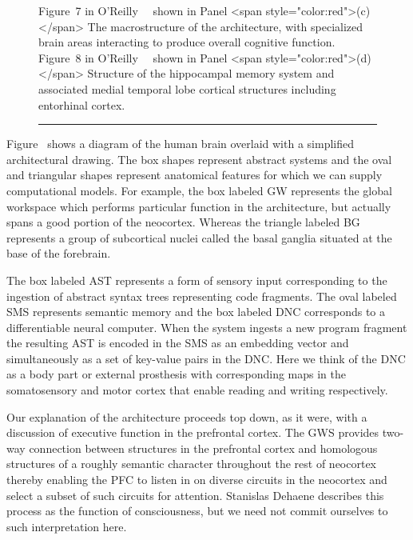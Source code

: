 \begin{figure}
{    %
    Figure~7 in O'Reilly~\etal{}~\cite{OReillyetalLEABRA-16} shown in Panel {\rawhtml<span style="color:red">(c)</span>\endrawhtml} \emdash{} The macrostructure of the {} architecture, with specialized brain areas interacting to produce overall cognitive function.
    Figure~8 in O'Reilly~\etal{}~\cite{OReillyetalLEABRA-16} shown in Panel {\rawhtml<span style="color:red">(d)</span>\endrawhtml} \emdash{} Structure of the hippocampal memory system and associated medial temporal lobe cortical structures including entorhinal cortex.}
%
  \hrule{}
%
\end{figure}


Figure~{} shows a diagram of the human brain overlaid with a simplified architectural drawing. The box shapes represent abstract systems and the oval and triangular shapes represent anatomical features for which we can supply computational models. For example, the box labeled GW represents the global workspace which performs particular function in the architecture, but actually spans a good portion of the neocortex. Whereas the triangle labeled BG represents a group of subcortical nuclei called the basal ganglia situated at the base of the forebrain.

The box labeled AST represents a form of sensory input corresponding to the ingestion of abstract syntax trees representing code fragments. The oval labeled SMS represents semantic memory and the box labeled DNC corresponds to a differentiable neural computer. When the system ingests a new program fragment the resulting AST is encoded in the SMS as an embedding vector and simultaneously as a set of key-value pairs in the DNC. Here we think of the DNC as a body part or external prosthesis with corresponding maps in the somatosensory and motor cortex that enable reading and writing respectively.

Our explanation of the architecture proceeds top down, as it were, with a discussion of executive function in the prefrontal cortex. The GWS provides two-way connection between structures in the prefrontal cortex and homologous structures of a roughly semantic character throughout the rest of neocortex thereby enabling the PFC to listen in on diverse circuits in the neocortex and select a subset of such circuits for attention. Stanislas Dehaene describes this process as the function of consciousness, but we need not commit ourselves to such interpretation here.

